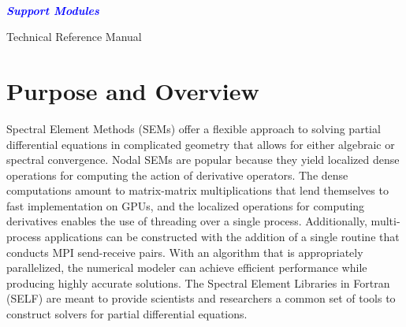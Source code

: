 \documentclass[12pt]{softwaremanual}
\author{Joseph Schoonover}
\title{}
\date{}
\begin{document}
\begin{titlingpage}
    
        \vspace*{2cm}
        
     \begin{flushright}
        {\selectfont
        \\
        }
       
        \vspace{1cm}
        
        \huge{
        \textbf{
        \textit{
        \textcolor{blue}{
           Support Modules
        }}}}
        
     \end{flushright}
         
        \vspace{2cm}
        
     \begin{center}
     
        {\selectfont
        \huge{
           Technical Reference Manual
        }
        
        \vspace{1.5cm}
        
        \textbf{
        \large{
           \theauthor 
         }}}
        
        \vfill
        
        
        \vspace{0.8cm}
        
     \end{center}
        
    
\end{titlingpage}



\tableofcontents

\pagestyle{myheadings}
\chapter{Purpose and Overview}
 Spectral Element Methods (SEMs) offer a flexible approach to solving partial differential equations in complicated geometry that allows for either algebraic or spectral convergence. Nodal SEMs are popular because they yield localized dense operations for computing the action of derivative operators. The dense computations amount to matrix-matrix multiplications that lend themselves to fast implementation on GPUs, and the localized operations for computing derivatives enables the use of threading over a single process. Additionally, multi-process applications can be constructed with the addition of a single routine that conducts MPI send-receive pairs. With an algorithm that is appropriately parallelized, the numerical modeler can achieve efficient performance while producing highly accurate solutions. The Spectral Element Libraries in Fortran (SELF) are meant to provide scientists and researchers a common set of tools to construct solvers for partial differential equations.
 
\end{document}
